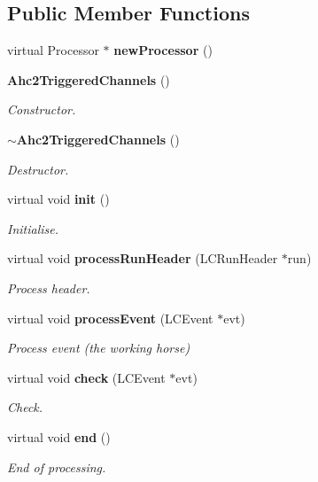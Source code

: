 \subsection*{Public Member Functions}
\begin{DoxyCompactItemize}
\item 
virtual Processor $\ast$ {\bfseries new\-Processor} ()\label{classCALICE_1_1Ahc2TriggeredChannels_a5dbc7143416c6a9105d4f0cde5cb663c}

\item 
{\bf Ahc2\-Triggered\-Channels} ()\label{classCALICE_1_1Ahc2TriggeredChannels_ae335b3372bd597849b7a36feb252de57}

\begin{DoxyCompactList}\small\item\em Constructor. \end{DoxyCompactList}\item 
{\bf $\sim$\-Ahc2\-Triggered\-Channels} ()\label{classCALICE_1_1Ahc2TriggeredChannels_a97364f50d9ee2398bac43362b20ce35d}

\begin{DoxyCompactList}\small\item\em Destructor. \end{DoxyCompactList}\item 
virtual void {\bf init} ()\label{classCALICE_1_1Ahc2TriggeredChannels_ab1480e85ecfefd73ecbf31e2defb3f9e}

\begin{DoxyCompactList}\small\item\em Initialise. \end{DoxyCompactList}\item 
virtual void {\bf process\-Run\-Header} (L\-C\-Run\-Header $\ast$run)\label{classCALICE_1_1Ahc2TriggeredChannels_a98fc8cd1bf9f7e259fc8829c6ddb13df}

\begin{DoxyCompactList}\small\item\em Process header. \end{DoxyCompactList}\item 
virtual void {\bf process\-Event} (L\-C\-Event $\ast$evt)\label{classCALICE_1_1Ahc2TriggeredChannels_a22b08792663ee91bcdf0b0a1787a3282}

\begin{DoxyCompactList}\small\item\em Process event (the working horse) \end{DoxyCompactList}\item 
virtual void {\bf check} (L\-C\-Event $\ast$evt)\label{classCALICE_1_1Ahc2TriggeredChannels_a229ebbf2ec8d18654edaca15f0636e38}

\begin{DoxyCompactList}\small\item\em Check. \end{DoxyCompactList}\item 
virtual void {\bf end} ()\label{classCALICE_1_1Ahc2TriggeredChannels_a2679e163d4ccf1caea0b41a88676e419}

\begin{DoxyCompactList}\small\item\em End of processing. \end{DoxyCompactList}\end{DoxyCompactItemize}

